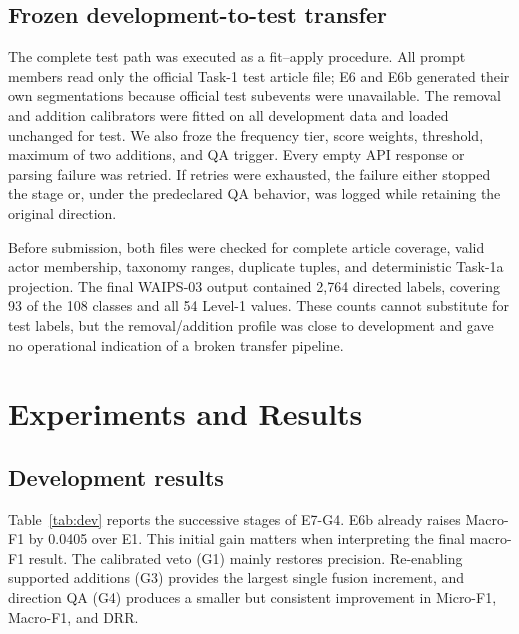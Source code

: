 \documentclass[sigconf,article,a4paper]{acmart}
\begin{document}
\subsection{Frozen development-to-test transfer}

The complete test path was executed as a fit--apply procedure. All prompt
members read only the official Task-1 test article file; E6 and E6b generated
their own segmentations because official test subevents were unavailable. The
removal and addition calibrators were fitted on all development data and loaded
unchanged for test. We also froze the frequency tier, score weights, threshold,
maximum of two additions, and QA trigger. Every empty API response or parsing
failure was retried. If retries were exhausted, the failure either stopped the
stage or, under the predeclared QA behavior, was logged while retaining the
original direction.

Before submission, both files were checked for complete article coverage,
valid actor membership, taxonomy ranges, duplicate tuples, and deterministic
Task-1a projection. The final WAIPS-03 output contained 2,764 directed labels,
covering 93 of the 108 classes and all 54 Level-1 values. These counts cannot
substitute for test labels, but the removal/addition profile was close to
development and gave no operational indication of a broken transfer pipeline.

\section{Experiments and Results}
\label{sec:results}

\subsection{Development results}

Table~\ref{tab:dev} reports the successive stages of E7-G4. E6b already raises
Macro-F1 by 0.0405 over E1. This initial gain matters when interpreting the
final macro-F1 result. The calibrated veto (G1) mainly restores precision.
Re-enabling supported additions (G3) provides the largest single fusion
increment, and direction QA (G4) produces a smaller but consistent improvement
in Micro-F1, Macro-F1, and DRR.
\end{document}
